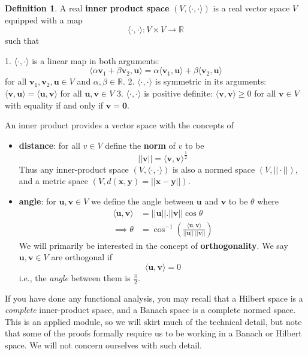 \documentclass[]{book}
\theoremstyle{definition}
\newtheorem{definition}{Definition}[chapter]
\theoremstyle{definition}
\theoremstyle{definition}
\theoremstyle{remark}
\begin{document}
\begin{definition}
\protect\hypertarget{def:innerprod}{}{\label{def:innerprod} }A real \textbf{inner product space} \((V, \langle\cdot,\cdot\rangle)\) is a real vector space \(V\) equipped with a map
\[ \langle\cdot,\cdot\rangle : V \times V \rightarrow \mathbb{R}\]
such that
\end{definition}
1. \(\langle\cdot,\cdot\rangle\) is a linear map in both arguments:
\[\langle \alpha \mathbf v_1+\beta \mathbf v_2, \mathbf u\rangle = \alpha \langle \mathbf v_1, \mathbf u\rangle + \beta \langle \mathbf v_2, \mathbf u\rangle\]
for all \(\mathbf v_1, \mathbf v_2, \mathbf u\in V\) and \(\alpha, \beta \in \mathbb{R}\).
2. \(\langle\cdot,\cdot\rangle\) is symmetric in its arguments: \(\langle \mathbf v, \mathbf u\rangle = \langle \mathbf u, \mathbf v\rangle\) for all \(\mathbf u,\mathbf v\in V\)
3. \(\langle\cdot,\cdot\rangle\) is positive definite: \(\langle \mathbf v, \mathbf v\rangle \geq 0\) for all \(\mathbf v\in V\) with equality if and only if \(\mathbf v={\mathbf 0}\).

An inner product provides a vector space with the concepts of

\begin{itemize}
\item
  \textbf{distance}: for all \(v\in V\) define the \textbf{norm} of \(v\) to be \[||\mathbf v|| = \langle \mathbf v, \mathbf v\rangle ^{\frac{1}{2}}\]
  Thus any inner-product space \((V, \langle\cdot,\cdot\rangle)\) is also a normed space \((V, ||\cdot||)\), and a metric space \((V, d(\mathbf x,\mathbf y)=||\mathbf x-\mathbf y||)\).
\item
  \textbf{angle}: for \(\mathbf u, \mathbf v\in V\) we define the angle between \(\mathbf u\) and \(\mathbf v\) to be \(\theta\) where
  \begin{align*}
  \langle \mathbf u,\mathbf v\rangle &= ||\mathbf u||.||\mathbf v||\cos \theta\\
  \implies \theta &= \cos^{-1}\left( \frac{\langle \mathbf u, \mathbf v\rangle}{||\mathbf u|| \;||\mathbf v||}\right)
  \end{align*}
  We will primarily be interested in the concept of \textbf{orthogonality}. We say \(\mathbf u, \mathbf v\in V\) are orthogonal if
  \[\langle \mathbf u, \mathbf v\rangle =0\]
  i.e., the \emph{angle} between them is \(\frac{\pi}{2}\).
\end{itemize}

If you have done any functional analysis, you may recall that a Hilbert space is a \emph{complete} inner-product space, and a Banach space is a complete normed space. This is an applied module, so we will skirt much of the technical detail, but note that some of the proofs formally require us to be working in a Banach or Hilbert space. We will not concern ourselves with such detail.
\end{document}
